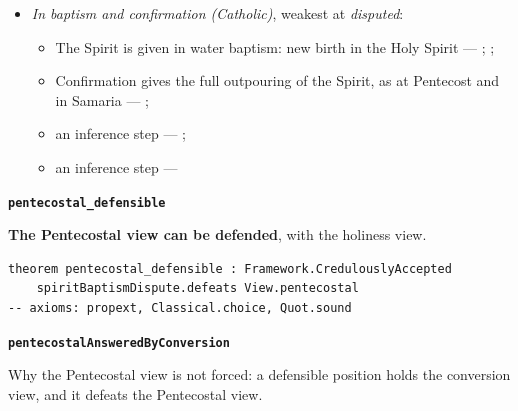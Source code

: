 \documentclass[11pt]{article}
\begin{document}
\begin{itemize}
\begin{itemize}
\item an inference step --- \cite{menzies-lukes-understanding-2017}; \cite{menzies-empowered-witness-1994}
\end{itemize}
\item \emph{In baptism and confirmation (Catholic)}, weakest at \emph{disputed}:
\begin{itemize}
\item The Spirit is given in water baptism: new birth in the Holy Spirit --- \cite[1262]{catholic-church-catechism-2000}; \cite[1265]{catholic-church-catechism-2000}; \cite[Small Catechism, Baptism, third part]{kolb-wengert-book-of-concord-2000}
\item Confirmation gives the full outpouring of the Spirit, as at Pentecost and in Samaria --- \cite[1302]{catholic-church-catechism-2000}; \cite[1288]{catholic-church-catechism-2000}
\item an inference step --- \cite[1302]{catholic-church-catechism-2000}; \cite[XXVIII.6]{westminster-confession-1647}
\item an inference step --- \cite[1302]{catholic-church-catechism-2000}
\end{itemize}
\end{itemize}
\par\medskip\noindent\textbf{\texttt{pentecostal\_\allowbreak{}defensible}}\par\nobreak\noindent
\textbf{The Pentecostal view can be defended}, with the holiness view.

{\small\begin{verbatim}
theorem pentecostal_defensible : Framework.CredulouslyAccepted
    spiritBaptismDispute.defeats View.pentecostal
-- axioms: propext, Classical.choice, Quot.sound
\end{verbatim}}
\par\medskip\noindent\textbf{\texttt{pentecostal\allowbreak{}Answered\allowbreak{}By\allowbreak{}Conversion}}\par\nobreak\noindent
Why the Pentecostal view is not forced: a defensible position holds the conversion view, and it defeats the Pentecostal view.
\end{document}
